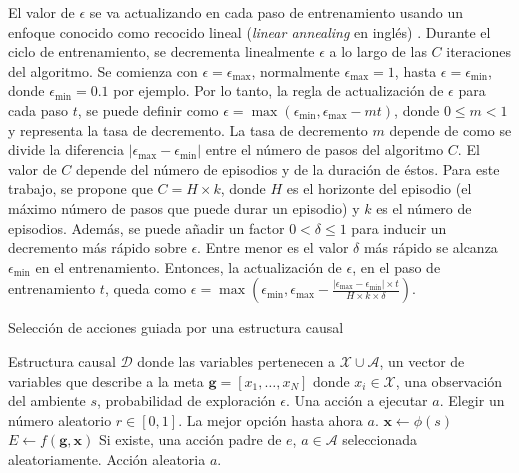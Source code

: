El valor de $\epsilon$ se va actualizando en cada paso de entrenamiento usando un enfoque conocido como recocido lineal (\textit{linear annealing} en inglés) \cite{pan2018policy}. Durante el ciclo de entrenamiento, se decrementa linealmente $\epsilon$ a lo largo de las $C$ iteraciones del algoritmo. Se comienza con $\epsilon = \epsilon_{\max}$, normalmente $\epsilon_{\max} = 1$, hasta $\epsilon = \epsilon_{\min}$, donde $\epsilon_{\min}=0.1$ por ejemplo. 
Por lo tanto, la regla de actualización de $\epsilon$ para cada paso $t$, se puede definir como
$\epsilon = \max(\epsilon_{\min}, \epsilon_{\max} - m t)$, donde $0 \leq m < 1$ y representa la tasa de decremento. La tasa de decremento $m$ depende de como se divide la diferencia $|\epsilon_{\max} - \epsilon_{\min}|$ entre el número de pasos del algoritmo $C$. El valor de $C$ depende del número de episodios y de la duración de éstos. Para este trabajo, se propone que $C = H \times k$, donde $H$ es el horizonte del episodio (el máximo número de pasos que puede durar un episodio) y $k$ es el número de episodios. Además, se puede añadir un factor $0 < \delta \leq 1$ para inducir un decremento más rápido sobre $\epsilon$. Entre menor es el valor $\delta$
más rápido se alcanza $\epsilon_{\min}$ en el entrenamiento. Entonces, la actualización de $\epsilon$, en el paso de entrenamiento $t$, queda como $\epsilon = \max(\epsilon_{\min}, \epsilon_{\max} - \frac{|\epsilon_{\max} - \epsilon_{\min}| \times t}{H \times k \times \delta})$.


\begin{mialgoritmo}
  \caption{Selección de acciones guiada por una estructura causal \label{alg:guided-action-selection}}
  \begin{algorithmic}[1]
  \REQUIRE Estructura causal $\mathcal{D}$ donde las variables pertenecen a $\mathcal{X} \cup \mathcal{A}$, un vector de variables
  que describe a la meta $\mathbf{g} = [x_1, \dots, x_N]$ donde $x_i \in \mathcal{X}$, una observación del ambiente $s$, probabilidad de exploración $\epsilon$.
  \ENSURE Una acción a ejecutar $a$.
  \STATE Elegir un número aleatorio $r \in [0, 1]$.
    \RETURN La mejor opción hasta ahora $a$.
   \ENDIF
  \STATE $\mathbf{x} \leftarrow \phi(s)$ 
   \STATE $E \leftarrow f(\mathbf{g}, \mathbf{x})$ 
        \RETURN Si existe, una acción padre de $e$, $a \in \mathcal{A}$ seleccionada aleatoriamente.
    \ENDIF
    \ENDFOR
    \RETURN Acción aleatoria $a$.
  \end{algorithmic}
\end{mialgoritmo}



